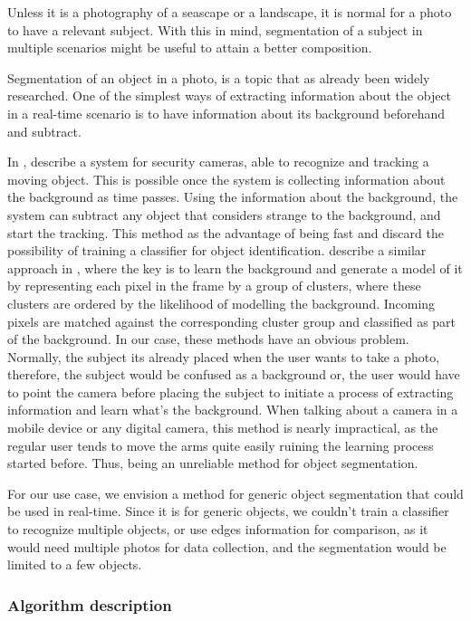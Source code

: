 Unless it is a photography of a seascape or a landscape, it is normal for a photo to have a relevant subject. With this in mind, segmentation of a subject in multiple scenarios might be useful to attain a better composition.

Segmentation of an object in a photo, is a topic that as already been widely researched. One of the simplest ways of extracting information about the object in a real-time scenario is to have information about its background beforehand and subtract. 

In \cite{yang2004real}, \citeauthor{yang2004real} describe a system for security cameras, able to recognize and tracking a moving object. This is possible once the system is collecting information about the background as time passes. Using the information about the background, the system can subtract any object that considers strange to the background, and start the tracking. This method as the advantage of being fast and discard the possibility of training a classifier for object identification. 
\citeauthor{butler2003real} describe a similar approach in \cite{butler2003real}, where the key is to learn the background and generate a model of it by representing each pixel in the frame by a group of clusters, where these clusters are ordered by the likelihood of modelling the background. Incoming pixels are matched against the corresponding cluster group and classified as part of the background.
In our case, these methods have an obvious problem. Normally, the subject its already placed when the user wants to take a photo, therefore, the subject would be confused as a background or, the user would have to point the camera before placing the subject to initiate a process of extracting information and learn what's the background. When talking about a  camera in a mobile device or any digital camera, this method is nearly impractical, as the regular user tends to move the arms quite easily ruining the learning process started before. Thus, being an unreliable method for object segmentation.

For our use case, we envision a method for generic object segmentation that could be used in real-time. Since it is for generic objects, we couldn't train a classifier to recognize multiple objects, or use edges information for comparison, as it would need multiple photos for data collection, and the segmentation would be limited to a few objects. 

\subsubsection{Algorithm description}

